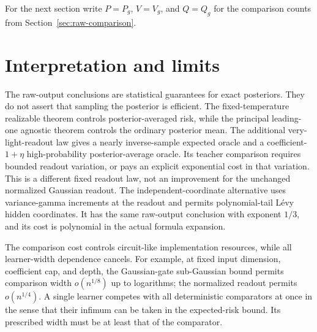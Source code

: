 \documentclass[11pt]{article}
\theoremstyle{remark}\newtheorem{remark}[theorem]{Remark}
\begin{document}








For the next section write $P=P_g$, $V=V_g$, and $Q=Q_g$ for the
comparison counts from Section~\ref{sec:raw-comparison}.



















\section{Interpretation and limits}
The raw-output conclusions are statistical guarantees for exact
posteriors. They do not assert that sampling the posterior is efficient.
The fixed-temperature realizable theorem controls posterior-averaged
risk, while the principal leading-one agnostic theorem controls the ordinary
posterior mean. The additional very-light-readout law gives a
nearly inverse-sample expected oracle and a coefficient-$1+\eta$
high-probability posterior-average oracle. Its teacher comparison
requires bounded readout variation, or pays an explicit exponential
cost in that variation. This is a different fixed readout law, not an
improvement for the unchanged normalized Gaussian readout.
The independent-coordinate alternative uses variance-gamma increments at the readout and permits polynomial-tail L\'evy hidden coordinates. It has the same raw-output conclusion with exponent $1/3$, and its cost is polynomial in the actual formula expansion.

The comparison cost controls circuit-like implementation resources,
while all learner-width dependence cancels. For example, at fixed input
dimension, coefficient cap, and depth, the Gaussian-gate sub-Gaussian
bound permits comparison width $o(n^{1/8})$ up to logarithms; the
normalized readout permits $o(n^{1/4})$. A single learner competes with
all deterministic comparators at once in the sense that their infimum
can be taken in the expected-risk bound. Its prescribed width must be
at least that of the comparator.
\end{document}

